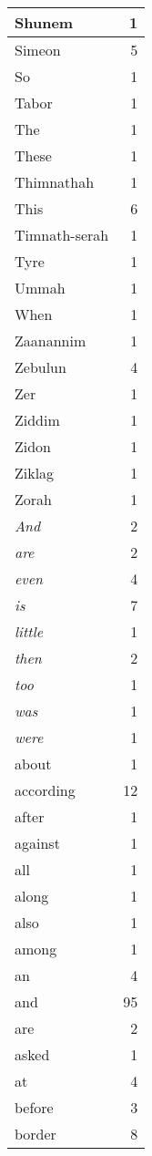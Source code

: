 \begin{center}
\begin{longtable}{l|r}
Shunem & 1\\ \hline 
Simeon & 5\\ \hline 
So & 1\\ \hline 
Tabor & 1\\ \hline 
The & 1\\ \hline 
These & 1\\ \hline 
Thimnathah & 1\\ \hline 
This & 6\\ \hline 
Timnath-serah & 1\\ \hline 
Tyre & 1\\ \hline 
Ummah & 1\\ \hline 
When & 1\\ \hline 
Zaanannim & 1\\ \hline 
Zebulun & 4\\ \hline 
Zer & 1\\ \hline 
Ziddim & 1\\ \hline 
Zidon & 1\\ \hline 
Ziklag & 1\\ \hline 
Zorah & 1\\ \hline 
\emph{And} & 2\\ \hline 
\emph{are} & 2\\ \hline 
\emph{even} & 4\\ \hline 
\emph{is} & 7\\ \hline 
\emph{little} & 1\\ \hline 
\emph{then} & 2\\ \hline 
\emph{too} & 1\\ \hline 
\emph{was} & 1\\ \hline 
\emph{were} & 1\\ \hline 
about & 1\\ \hline 
according & 12\\ \hline 
after & 1\\ \hline 
against & 1\\ \hline 
all & 1\\ \hline 
along & 1\\ \hline 
also & 1\\ \hline 
among & 1\\ \hline 
an & 4\\ \hline 
and & 95\\ \hline 
are & 2\\ \hline 
asked & 1\\ \hline 
at & 4\\ \hline 
before & 3\\ \hline 
border & 8\\ \hline 

\end{longtable}
\end{center}
